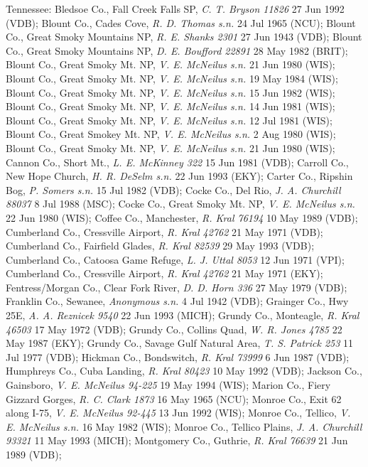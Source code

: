 \documentclass{article}
\begin{document}
Tennessee:
Bledsoe Co., Fall Creek Falls SP, \textit{C. T. Bryson 11826} 27 Jun 1992 (VDB);
Blount Co., Cades Cove, \textit{R. D. Thomas s.n.} 24 Jul 1965 (NCU);
Blount Co., Great Smoky Mountains NP, \textit{R. E. Shanks 2301} 27 Jun 1943 (VDB);
Blount Co., Great Smoky Mountains NP, \textit{D. E. Boufford 22891} 28 May 1982 (BRIT);
Blount Co., Great Smoky Mt. NP, \textit{V. E. McNeilus s.n.} 21 Jun 1980 (WIS);
Blount Co., Great Smoky Mt. NP, \textit{V. E. McNeilus s.n.} 19 May 1984 (WIS);
Blount Co., Great Smoky Mt. NP, \textit{V. E. McNeilus s.n.} 15 Jun 1982 (WIS);
Blount Co., Great Smoky Mt. NP, \textit{V. E. McNeilus s.n.} 14 Jun 1981 (WIS);
Blount Co., Great Smoky Mt. NP, \textit{V. E. McNeilus s.n.} 12 Jul 1981 (WIS);
Blount Co., Great Smokey Mt. NP, \textit{V. E. McNeilus s.n.} 2 Aug 1980 (WIS);
Blount Co., Great Smoky Mt. NP, \textit{V. E. McNeilus s.n.} 21 Jun 1980 (WIS);
Cannon Co., Short Mt., \textit{L. E. McKinney 322} 15 Jun 1981 (VDB);
Carroll Co., New Hope Church, \textit{H. R. DeSelm s.n.} 22 Jun 1993 (EKY);
Carter Co., Ripshin Bog, \textit{P. Somers s.n.} 15 Jul 1982 (VDB);
Cocke Co., Del Rio, \textit{J. A. Churchill 88037} 8 Jul 1988 (MSC);
Cocke Co., Great Smoky Mt. NP, \textit{V. E. McNeilus s.n.} 22 Jun 1980 (WIS);
Coffee Co., Manchester, \textit{R. Kral 76194} 10 May 1989 (VDB);
Cumberland Co., Cressville Airport, \textit{R. Kral 42762} 21 May 1971 (VDB);
Cumberland Co., Fairfield Glades, \textit{R. Kral 82539} 29 May 1993 (VDB);
Cumberland Co., Catoosa Game Refuge, \textit{L. J. Uttal 8053} 12 Jun 1971 (VPI);
Cumberland Co., Cressville Airport, \textit{R. Kral 42762} 21 May 1971 (EKY);
Fentress/Morgan Co., Clear Fork River, \textit{D. D. Horn 336} 27 May 1979 (VDB);
Franklin Co., Sewanee, \textit{Anonymous s.n.} 4 Jul 1942 (VDB);
Grainger Co., Hwy 25E, \textit{A. A. Reznicek 9540} 22 Jun 1993 (MICH);
Grundy Co., Monteagle, \textit{R. Kral 46503} 17 May 1972 (VDB);
Grundy Co., Collins Quad, \textit{W. R. Jones 4785} 22 May 1987 (EKY);
Grundy Co., Savage Gulf Natural Area, \textit{T. S. Patrick 253} 11 Jul 1977 (VDB);
Hickman Co., Bondswitch, \textit{R. Kral 73999} 6 Jun 1987 (VDB);
Humphreys Co., Cuba Landing, \textit{R. Kral 80423} 10 May 1992 (VDB);
Jackson Co., Gainsboro, \textit{V. E. McNeilus 94-225} 19 May 1994 (WIS);
Marion Co., Fiery Gizzard Gorges, \textit{R. C. Clark 1873} 16 May 1965 (NCU);
Monroe Co., Exit 62 along I-75, \textit{V. E. McNeilus 92-445} 13 Jun 1992 (WIS);
Monroe Co., Tellico, \textit{V. E. McNeilus s.n.} 16 May 1982 (WIS);
Monroe Co., Tellico Plains, \textit{J. A. Churchill 93321} 11 May 1993 (MICH);
Montgomery Co., Guthrie, \textit{R. Kral 76639} 21 Jun 1989 (VDB);
\end{document}
